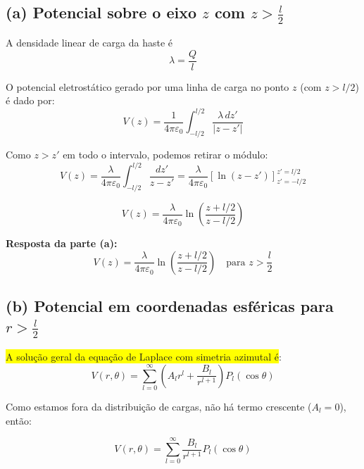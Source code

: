 \documentclass[a4paper,12pt]{article}
\begin{document}
\begin{flushleft}
\subsection*{(a) Potencial sobre o eixo \( z \) com \( z > \frac{l}{2} \)}

A densidade linear de carga da haste é
\begin{equation}
\lambda = \frac{Q}{l}
\end{equation}

O potencial eletrostático gerado por uma linha de carga no ponto \( z \) (com \( z > l/2 \)) é dado por:
\begin{equation}
V(z) = \frac{1}{4\pi\varepsilon_0} \int_{-l/2}^{l/2} \frac{\lambda \, dz'}{|z - z'|}
\end{equation}

Como \( z > z' \) em todo o intervalo, podemos retirar o módulo:
\begin{equation}
V(z) = \frac{\lambda}{4\pi\varepsilon_0} \int_{-l/2}^{l/2} \frac{dz'}{z - z'} = \frac{\lambda}{4\pi\varepsilon_0} \left[ \ln(z - z') \right]_{z' = -l/2}^{z' = l/2}
\end{equation}

\begin{equation}
V(z) = \frac{\lambda}{4\pi\varepsilon_0} \ln\left( \frac{z + l/2}{z - l/2} \right)
\end{equation}

\noindent\textbf{Resposta da parte (a):}
\begin{equation}
\boxed{V(z) = \frac{\lambda}{4\pi\varepsilon_0} \ln\left( \frac{z + l/2}{z - l/2} \right)}
\quad \text{para } z > \frac{l}{2}
\end{equation}

\subsection*{(b) Potencial em coordenadas esféricas para \( r > \frac{l}{2} \)}

\colorbox{yellow}{A solução geral da equação de Laplace com simetria azimutal é}:
\begin{equation}
\boxed{
V(r, \theta) = \sum_{l=0}^{\infty} \left( A_l r^l + \frac{B_l}{r^{l+1}} \right) P_l(\cos\theta)
}
\end{equation}

Como estamos \colorbox{blue!15}{fora da distribuição de cargas, não há termo crescente (\( A_l = 0 \))}, então:

\begin{equation}
\boxed{
V(r, \theta) = \sum_{l=0}^{\infty} \frac{B_l}{r^{l+1}} P_l(\cos\theta)
}
\end{equation}


\end{flushleft}
\end{document}

